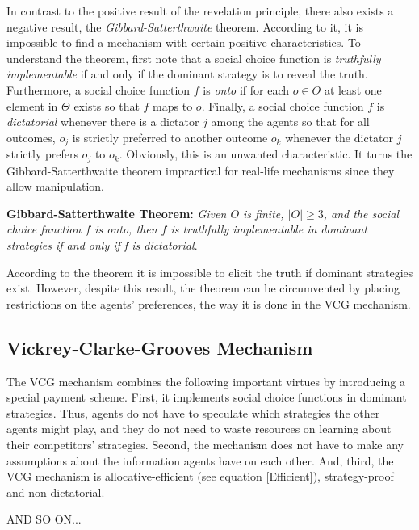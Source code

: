 In contrast to the positive result of the revelation principle,
there also exists a negative result, the
\emph{Gibbard-Satterthwaite} theorem. According to it, it is
impossible to find a mechanism with certain positive
characteristics. To understand the theorem, first note that a
social choice function is \emph{truthfully implementable} if and
only if the dominant strategy is to reveal the truth. Furthermore,
a social choice function $f$ is \emph{onto} if for each $o \in O$
at least one element in $\Theta$ exists so that $f$ maps to $o$.
Finally, a social choice function $f$ is \emph{dictatorial}
whenever there is a dictator $j$ among the agents so that for all
outcomes, $o_j$ is strictly preferred to another outcome $o_k$
whenever the dictator $j$ strictly prefers $o_j$ to $o_k$.
Obviously, this is an unwanted characteristic. It turns the
Gibbard-Satterthwaite theorem impractical for real-life mechanisms
since they allow manipulation.

\textbf{Gibbard-Satterthwaite Theorem:} \emph{Given $O$ is finite,
$|O|\geq 3$, and the social choice function $f$ is onto, then $f$
is truthfully implementable in dominant strategies if and only if
f is dictatorial}.

According to the theorem it is impossible to elicit the truth if
dominant strategies exist. However, despite this result, the
theorem can be circumvented by placing restrictions on the agents'
preferences, the way it is done in the VCG mechanism.

\subsection{Vickrey-Clarke-Grooves Mechanism}
The VCG mechanism combines the following important virtues by
introducing a special payment scheme. First, it implements social
choice functions in dominant strategies. Thus, agents do not have
to speculate which strategies the other agents might play, and
they do not need to waste resources on learning about their
competitors' strategies. Second, the mechanism does not have to
make any assumptions about the information agents have on each
other. And, third, the VCG mechanism is allocative-efficient (see
equation \ref{Efficient}), strategy-proof and non-dictatorial.

AND SO ON... 